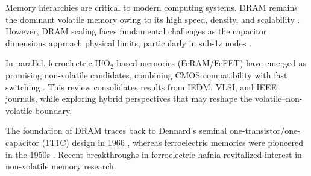 Memory hierarchies are critical to modern computing systems. DRAM remains the dominant volatile memory owing to its high speed, density, and scalability \cite{choi2022,kim2021_dram}. However, DRAM scaling faces fundamental challenges as the capacitor dimensions approach physical limits, particularly in sub-1z nodes \cite{kim2021_dram,iedm2023_dram}. 

In parallel, ferroelectric HfO$_2$-based memories (FeRAM/FeFET) have emerged as promising non-volatile candidates, combining CMOS compatibility with fast switching \cite{boscke2011,mueller2012,noheda2023}. This review consolidates results from IEDM, VLSI, and IEEE journals, while exploring hybrid perspectives that may reshape the volatile--non-volatile boundary.

The foundation of DRAM traces back to Dennard’s seminal one-transistor/one-capacitor (1T1C) design in 1966 \cite{dennard1966}, whereas ferroelectric memories were pioneered in the 1950s \cite{scott1998}. Recent breakthroughs in ferroelectric hafnia \cite{boscke2011,mueller2012} revitalized interest in non-volatile memory research.
